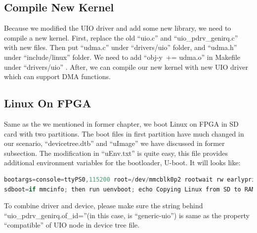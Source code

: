 \subsection{Compile New Kernel}
\label{subsec:Compile New Kernel}
Because we modified the UIO driver and add some new library, we need to compile a new kernel. First, replace the old ``uio.c'' and ``uio\_pdrv\_genirq.c'' with new files. Then put ``udma.c'' under ``drivers/uio'' folder, and ``udma.h'' under ``include/linux'' folder. We need to add ``obj-y\  += udma.o'' in Makefile under ``drivers/uio'' . After, we can compile our new kernel with new UIO driver which can support DMA functions.

\subsection{Linux On FPGA}
\label{subsec:Linux On FPGA}
Same as the we mentioned in former chapter, we boot Linux on FPGA in SD card with two partitions. The boot files in first partition have much changed in our scenario, ``devicetree.dtb'' and ``uImage'' we have discussed in former subsection. The modification in ``uEnv.txt'' is quite easy, this file provides additional environment variables for the bootloader, U-boot. It will looks like: 
\begin{lstlisting}[frame=single,language=C]
bootargs=console=ttyPS0,115200 root=/dev/mmcblk0p2 rootwait rw earlyprintk uio_pdrv_genirq.of_id=genric-uio
sdboot=if mmcinfo; then run uenvboot; echo Copying Linux from SD to RAM... && load mmc 0 ${kernel_load_address} ${kernel_image} && load mmc 0 ${devicetree_load_address} ${devicetree_image} && load mmc 0 ${ramdisk_load_address} ${ramdisk_image} && bootm ${kernel_load_address} - ${devicetree_load_address}; fi
\end{lstlisting}
To combine driver and device, please make sure the string behind ``uio\_pdrv\_genirq.of\_id=''(in this case, is ``generic-uio'') is same as the property ``compatible'' of UIO node in device tree file.

